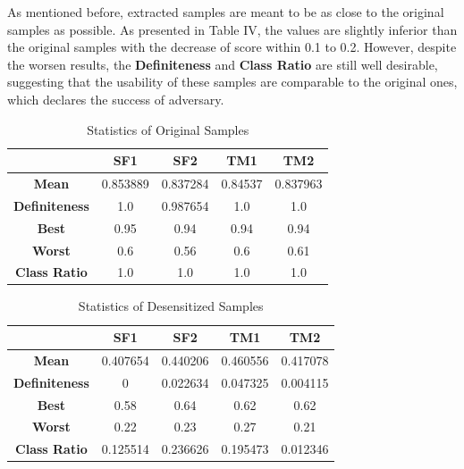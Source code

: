 \documentclass[journal]{IEEEtran} %
\begin{document}
As mentioned before, extracted samples are meant to be as close to the original samples as possible. As presented in Table IV, the values are slightly inferior than the original samples with the decrease of score within 0.1 to 0.2. However, despite the worsen results, the \textbf{Definiteness} and \textbf{Class Ratio} are still well desirable, suggesting that the usability of these samples are comparable to the original ones, which declares the success of adversary.

\begin{table}[htbp]
    \centering
    \caption{Statistics of Original Samples}
    \begin{tabular}{|c|c|c|c|c|}
        \hline
        & \textbf{SF1} & \textbf{SF2} & \textbf{TM1} & \textbf{TM2} \\
        \hline
        \textbf{Mean} & 0.853889 & 0.837284 & 0.84537 & 0.837963 \\
        \hline
        \textbf{Definiteness} & 1.0 & 0.987654 & 1.0 & 1.0 \\
        \hline
        \textbf{Best} & 0.95 & 0.94 & 0.94 & 0.94 \\
        \hline
        \textbf{Worst} & 0.6 & 0.56 & 0.6 & 0.61 \\
        \hline
        \textbf{Class Ratio} & 1.0 & 1.0 & 1.0 & 1.0 \\
        \hline
    \end{tabular}
    \label{tab:st_org}
\end{table}

\begin{table}[htbp]
    \centering
    \caption{Statistics of Desensitized Samples}
    \begin{tabular}{|c|c|c|c|c|}
        \hline
        & \textbf{SF1} & \textbf{SF2} & \textbf{TM1} & \textbf{TM2} \\
        \hline
        \textbf{Mean} & 0.407654 & 0.440206 & 0.460556 & 0.417078 \\
        \hline
        \textbf{Definiteness} & 0 & 0.022634 & 0.047325 & 0.004115 \\
        \hline
        \textbf{Best} & 0.58 & 0.64 & 0.62 & 0.62 \\
        \hline
        \textbf{Worst} & 0.22 & 0.23 & 0.27 & 0.21 \\
        \hline
        \textbf{Class Ratio} & 0.125514 & 0.236626 & 0.195473 & 0.012346 \\
        \hline
    \end{tabular}
    \label{tab:st_des}
\end{table}
\end{document}
